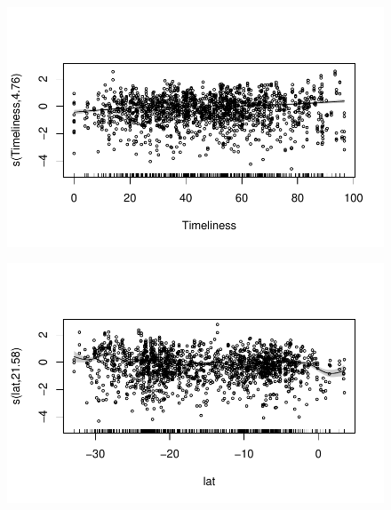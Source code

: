 \documentclass[
  letterpaper,
  DIV=11,
  numbers=noendperiod]{scrartcl}
\begin{document}
\begin{figure}[H]

{\centering \includegraphics{Group34Coursework_files/figure-pdf/unnamed-chunk-17-8.pdf}

}

\end{figure}

\begin{figure}[H]

{\centering \includegraphics{Group34Coursework_files/figure-pdf/unnamed-chunk-17-9.pdf}

}

\end{figure}
\end{document}
